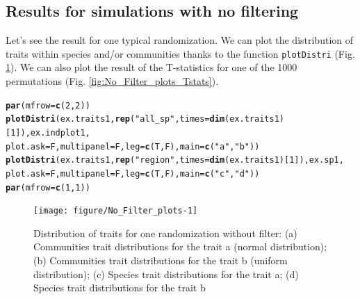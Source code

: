 \documentclass[12pt]{article}\usepackage[]{graphicx}\usepackage[]{color}
\makeatletter
\newcommand{\hlnum}[1]{\textcolor[rgb]{0.686,0.059,0.569}{#1}}%
\newcommand{\hlstr}[1]{\textcolor[rgb]{0.192,0.494,0.8}{#1}}%
\newcommand{\hlstd}[1]{\textcolor[rgb]{0.345,0.345,0.345}{#1}}%
\newcommand{\hlkwc}[1]{\textcolor[rgb]{0.333,0.667,0.333}{#1}}%
\newcommand{\hlkwd}[1]{\textcolor[rgb]{0.737,0.353,0.396}{\textbf{#1}}}%
\newenvironment{kframe}{%
 \def\at@end@of@kframe{}%
 \ifinner\ifhmode%
  \def\at@end@of@kframe{\end{minipage}}%
  \begin{minipage}{\columnwidth}%
 \fi\fi%
 \def\FrameCommand##1{\hskip\@totalleftmargin \hskip-\fboxsep
 \colorbox{shadecolor}{##1}\hskip-\fboxsep
     \hskip-\linewidth \hskip-\@totalleftmargin \hskip\columnwidth}%
 \MakeFramed {\advance\hsize-\width
   \@totalleftmargin\z@ \linewidth\hsize
   \@setminipage}}%
 {\par\unskip\endMakeFramed%
 \at@end@of@kframe}
\newenvironment{knitrout}{}{} %
\makeatother
\begin{document}
  \subsection {Results for simulations with no filtering}
Let's see the result for one typical randomization. We can plot the distribution of traits within species and/or communities thanks to the function \texttt{plotDistri} (Fig. \ref{fig:No_Filter_plots}). We can also plot the result of the T-statistics for one of the 1000 permutations (Fig. \ref{fig:No_Filter_plots_Tstats}).

\begin{knitrout}\small
{}\color{fgcolor}\begin{kframe}
\begin{alltt}
\hlkwd{par}\hlstd{(}\hlkwc{mfrow}\hlstd{=}\hlkwd{c}\hlstd{(}\hlnum{2}\hlstd{,} \hlnum{2}\hlstd{))}
\hlkwd{plotDistri}\hlstd{(ex.traits1,} \hlkwd{rep}\hlstd{(}\hlstr{"all_sp"}\hlstd{,} \hlkwc{times} \hlstd{=} \hlkwd{dim}\hlstd{(ex.traits1)[}\hlnum{1}\hlstd{]), ex.indplot1,}
           \hlkwc{plot.ask} \hlstd{= F,} \hlkwc{multipanel} \hlstd{= F,} \hlkwc{leg} \hlstd{=}\hlkwd{c}\hlstd{(T, F),} \hlkwc{main} \hlstd{=} \hlkwd{c}\hlstd{(}\hlstr{"a"}\hlstd{,} \hlstr{"b"}\hlstd{))}
\hlkwd{plotDistri}\hlstd{(ex.traits1,} \hlkwd{rep}\hlstd{(}\hlstr{"region"}\hlstd{,} \hlkwc{times} \hlstd{=} \hlkwd{dim}\hlstd{(ex.traits1)[}\hlnum{1}\hlstd{]), ex.sp1,}
           \hlkwc{plot.ask} \hlstd{= F,} \hlkwc{multipanel} \hlstd{= F,} \hlkwc{leg} \hlstd{=}\hlkwd{c}\hlstd{(T, F),} \hlkwc{main} \hlstd{=} \hlkwd{c}\hlstd{(}\hlstr{"c"}\hlstd{,} \hlstr{"d"}\hlstd{))}
\hlkwd{par}\hlstd{(}\hlkwc{mfrow}\hlstd{=}\hlkwd{c}\hlstd{(}\hlnum{1}\hlstd{,} \hlnum{1}\hlstd{))}
\end{alltt}
\end{kframe}\begin{figure}

{\centering \texttt{[image: figure/No\_Filter\_plots-1]} 

}

\caption[Distribution of traits for one randomization without filter]{Distribution of traits for one randomization without filter: (a) Communities trait distributions for the trait a (normal distribution); (b) Communities trait distributions for the trait b (uniform distribution); (c) Species trait distributions for the trait a; (d) Species trait distributions for the trait b\label{fig:No_Filter_plots}}
\end{figure}


\end{knitrout}
\end{document}
